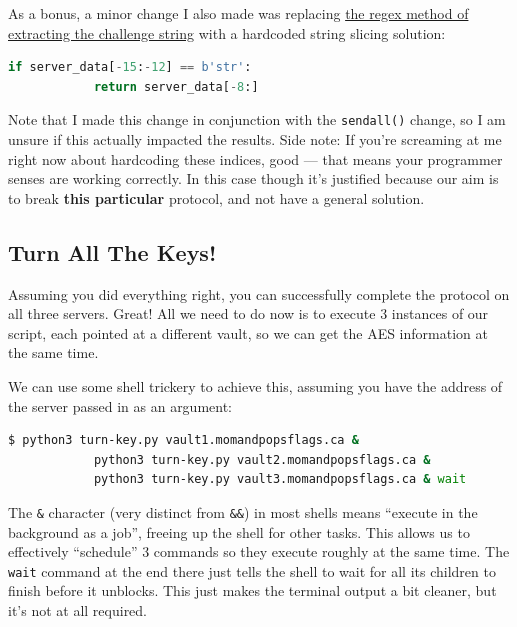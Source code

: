 \documentclass[11pt]{article}
\begin{document}
    \bigskip

    As a bonus, a minor change I also made was replacing \hyperref[lst:regex-extract]{the regex method of extracting the challenge string} with a hardcoded string slicing solution:

    \begin{lstlisting}[gobble=8,label={lst:regex-efficiency},language=Python]
        if server_data[-15:-12] == b'str':
            return server_data[-8:]
    \end{lstlisting}

    Note that I made this change in conjunction with the \verb`sendall()` change, so I am unsure if this actually impacted the results. Side note: If you're screaming at me right now about hardcoding these indices, good --- that means your programmer senses are working correctly. In this case though it's justified because our aim is to break \textbf{this particular} protocol, and not have a general solution.

    \subsection{Turn All The Keys!}\label{subsec:turn-all-the-keys}

    Assuming you did everything right, you can successfully complete the protocol on all three servers. Great! All we need to do now is to execute 3 instances of our script, each pointed at a different vault, so we can get the AES information at the same time.

    We can use some shell trickery to achieve this, assuming you have the address of the server passed in as an argument:

    \begin{lstlisting}[gobble=8,label={lst:parallel-commands},language=Bash]
        $ python3 turn-key.py vault1.momandpopsflags.ca &
            python3 turn-key.py vault2.momandpopsflags.ca &
            python3 turn-key.py vault3.momandpopsflags.ca & wait
    \end{lstlisting}

    The \verb`&` character (very distinct from \verb`&&`) in most shells means ``execute in the background as a job'', freeing up the shell for other tasks. This allows us to effectively ``schedule'' 3 commands so they execute roughly at the same time. The \verb`wait` command at the end there just tells the shell to wait for all its children to finish before it unblocks. This just makes the terminal output a bit cleaner, but it's not at all required.
\end{document}
